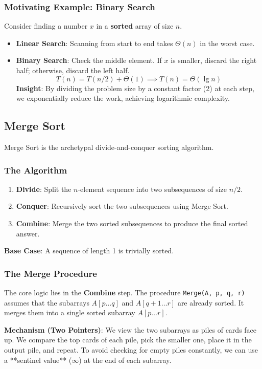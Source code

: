 \documentclass[12pt]{article}
\theoremstyle{blueplain}
\theoremstyle{bluedef}
\theoremstyle{blueremark}
\begin{document}
\subsubsection{Motivating Example: Binary Search}
Consider finding a number $x$ in a \textbf{sorted} array of size $n$.
\begin{itemize}
    \item \textbf{Linear Search}: Scanning from start to end takes $\Theta(n)$ in the worst case.
    \item \textbf{Binary Search}: Check the middle element. If $x$ is smaller, discard the right half; otherwise, discard the left half.
          \[ T(n) = T(n/2) + \Theta(1) \implies T(n) = \Theta(\lg n) \]
          \textbf{Insight}: By dividing the problem size by a constant factor (2) at each step, we exponentially reduce the work, achieving logarithmic complexity.
\end{itemize}

\subsection{Merge Sort}

Merge Sort is the archetypal divide-and-conquer sorting algorithm.

\subsubsection{The Algorithm}
\begin{enumerate}
    \item \textbf{Divide}: Split the $n$-element sequence into two subsequences of size $n/2$.
    \item \textbf{Conquer}: Recursively sort the two subsequences using Merge Sort.
    \item \textbf{Combine}: Merge the two sorted subsequences to produce the final sorted answer.
\end{enumerate}
\textbf{Base Case}: A sequence of length 1 is trivially sorted.

\subsubsection{The Merge Procedure}
The core logic lies in the \textbf{Combine} step. The procedure \texttt{Merge(A, p, q, r)} assumes that the subarrays $A[p \dots q]$ and $A[q+1 \dots r]$ are already sorted. It merges them into a single sorted subarray $A[p \dots r]$.

\textbf{Mechanism (Two Pointers)}:
We view the two subarrays as piles of cards face up. We compare the top cards of each pile, pick the smaller one, place it in the output pile, and repeat.
To avoid checking for empty piles constantly, we can use a **sentinel value** ($\infty$) at the end of each subarray.
\end{document}

